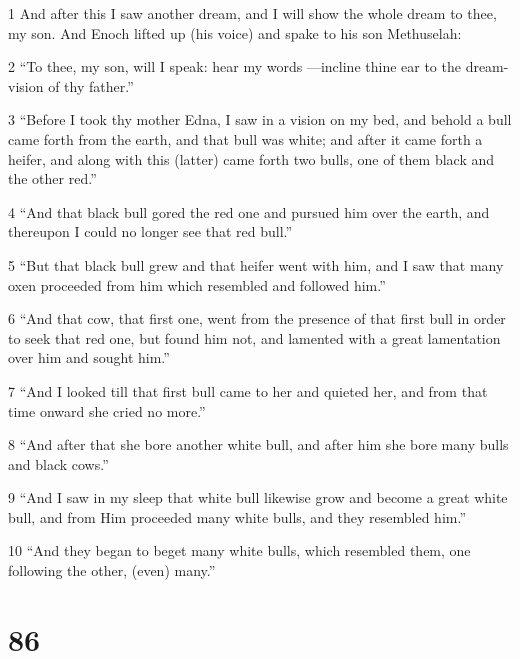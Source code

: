 \par 1 And after this I saw another dream, and I will show the whole dream to thee, my son. And Enoch lifted up (his voice) and spake to his son Methuselah:
\par 2 “To thee, my son, will I speak: hear my words —incline thine ear to the dream-vision of thy father.”
\par 3 “Before I took thy mother Edna, I saw in a vision on my bed, and behold a bull came forth from the earth, and that bull was white; and after it came forth a heifer, and along with this (latter) came forth two bulls, one of them black and the other red.”
\par 4 “And that black bull gored the red one and pursued him over the earth, and thereupon I could no longer see that red bull.”
\par 5 “But that black bull grew and that heifer went with him, and I saw that many oxen proceeded from him which resembled and followed him.”
\par 6 “And that cow, that first one, went from the presence of that first bull in order to seek that red one, but found him not, and lamented with a great lamentation over him and sought him.”
\par 7 “And I looked till that first bull came to her and quieted her, and from that time onward she cried no more.”
\par 8 “And after that she bore another white bull, and after him she bore many bulls and black cows.”
\par 9 “And I saw in my sleep that white bull likewise grow and become a great white bull, and from Him proceeded many white bulls, and they resembled him.”
\par 10 “And they began to beget many white bulls, which resembled them, one following the other, (even) many.”

\chapter{86}

